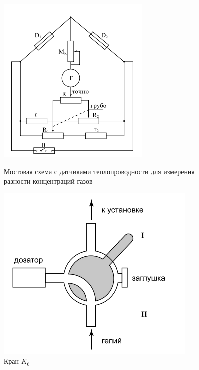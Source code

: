 \documentclass[a4paper,12pt]{article} %
\begin{document}
\begin{figure}[h]
\begin{center}
\begin{minipage}[h]{0.4\linewidth}
\includegraphics[width=0.8\linewidth]{bridge.png}
\label{bridge}
\caption{Мостовая схема с датчиками теплопроводности для измерения разности концентраций газов} 
\end{minipage}
\hfill
\begin{minipage}[h]{0.5\linewidth}
\includegraphics[width=1\linewidth]{K_6.png}
\caption{Кран $K_6$}
\end{minipage}
\end{center}
\end{figure}
\end{document}
